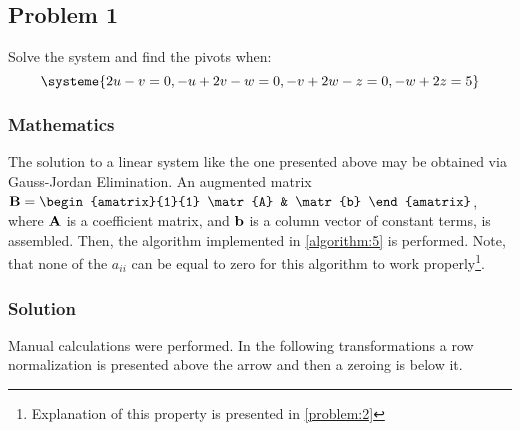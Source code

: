 \subsection{Problem 1}

Solve the system and find the pivots when:
\begin{equation*}
    \systeme{2u-v=0,-u+2v-w=0,-v+2w-z=0,-w+2z=5}
\end{equation*}

\subsubsection*{Mathematics}
The solution to a linear system like the one presented above may be obtained via Gauss-Jordan Elimination. An augmented matrix
$\matr{B} = \begin{amatrix}{1}{1}
        \matr{A} & \matr{b}
\end{amatrix}$, where $\mathbf{A}$ is a coefficient matrix, and $\mathbf{b}$ is a column vector of constant terms, is assembled. Then, the algorithm implemented in \ref{algorithm:5} is performed. Note, that none of the $a_{ii}$ can be equal to zero for this algorithm to work properly\footnote{Explanation of this property is presented in \ref{problem:2}}.

\subsubsection*{Solution}

Manual calculations were performed. In the following transformations a row normalization is presented above the arrow and then a zeroing is below it.

